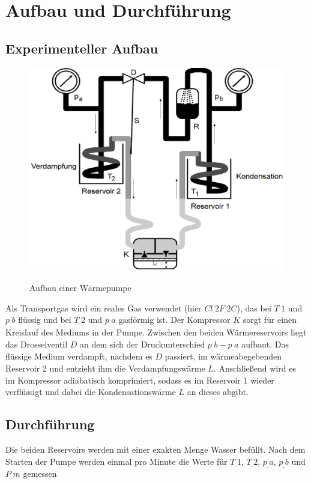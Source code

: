
\section{Aufbau und Durchführung}
\label{sec:Durchführung}
\subsection{Experimenteller Aufbau}
\begin{figure}
\caption{Aufbau einer Wärmepumpe\cite{V206}}
\includegraphics[scale=0.5]{content/images/aufbau.eps}
\label{fig:abb1}
\end{figure}
\noindent Als Transportgas wird ein reales Gas verwendet (hier $Cl_.{2}F_.{2}C$), das bei $T_.{1}$ und $p_.{b}$ flüssig und bei $T_.{2}$ und $p_.{a}$ gasförmig ist.
Der Kompressor $K$ sorgt für einen Kreislauf des Mediums in der Pumpe.\newline
Zwischen den beiden Wärmereservoirs liegt das Drosselventil $D$
an dem sich der Druckunterschied $p_.{b}-p_.{a}$ aufbaut.\newline
Das flüssige Medium verdampft, nachdem es $D$ passiert, im wärmeabegebenden Reservoir 2 und entzieht ihm die Verdampfungswärme $L$.
Anschließend wird es im Kompressor adiabatisch komprimiert, sodass es im Reservoir 1 wieder verflüssigt und dabei die Kondensationswärme $L$ an dieses abgibt.
\subsection{Durchführung}
Die beiden Reservoirs werden mit einer exakten Menge Wasser befüllt.\newline
Nach dem Starten der Pumpe werden einmal pro Minute die Werte für $T_.{1}$, $T_.{2}$, $p_.{a}$, $p_.{b}$ und $P_.{m}$ gemessen